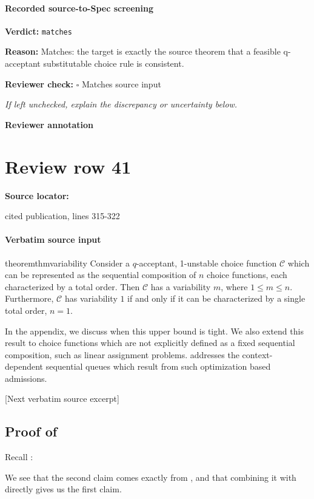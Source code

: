 \documentclass[10pt]{article}
\newcommand{\reviewerbox}{%
  \par\noindent\fbox{\parbox{0.96\linewidth}{\rule{0pt}{0.38in}}}\par
}
\newcommand{\reviewmatch}[1]{%
  \par\noindent\textbf{Reviewer check:} $\square$\; #1\par
  \noindent\emph{If left unchecked, explain the discrepancy or uncertainty below.}\par
}
\begin{document}
\paragraph{Recorded source-to-Spec screening}
\textbf{Verdict:} \texttt{matches}
\\
{\raggedright
\textbf{Reason:} Matches:\allowbreak{} the target is exactly the source theorem that a feasible q-\allowbreak{}acceptant substitutable choice rule is consistent.\allowbreak{}
\par}
\reviewmatch{Matches source input}
\noindent\textbf{Reviewer annotation}\par
\reviewerbox
\clearpage
\hypertarget{source-claim-7c749451f4caf111}{}
\section*{Review row 41}
\textbf{Source locator:} {\footnotesize\raggedright cited publication, lines 315-\allowbreak{}322\par}
\paragraph{Verbatim source input}
\begin{ReviewVerbatim}
\begin{restatable}{theorem}{thmvariability}
\label{thm:variability}
Consider a $q$-acceptant, 1-unstable choice function $\mathcal C$ which
can be represented as the sequential composition of $n$ choice functions, each characterized by a total order.
Then $\mathcal C$ has a variability  $m$, where $1 \leq m \leq n$. Furthermore, $\mathcal C$ has variability $1$ if and only if it can be characterized by a single total order, $n=1$.
\end{restatable}
In the appendix, we discuss when this upper bound is tight. We also extend this result to choice functions which are not explicitly defined as a fixed sequential composition, such as linear assignment problems.
 addresses the context-dependent sequential queues which result from such optimization based admissions.

[Next verbatim source excerpt]

\subsection{Proof of } \label{sec:variability-proof}

Recall :
\thmvariability*

We see that the second claim comes exactly from , and that combining it with  directly gives us the first claim.
\end{ReviewVerbatim}
\end{document}
